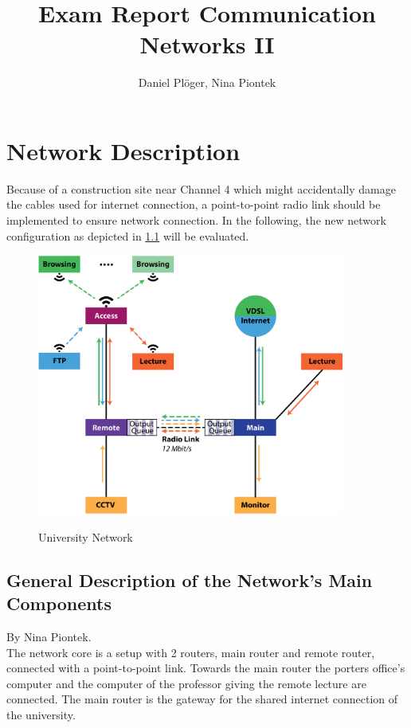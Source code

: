 \documentclass[a4paper,10pt]{book}\usepackage{graphicx}
\title{Exam Report Communication Networks II}
\author{Daniel Plöger, Nina Piontek}
\begin{document}
\maketitle
\tableofcontents



\chapter{Network Description}
Because of a construction site near Channel 4 which might accidentally damage the cables 
used for internet connection,
a point-to-point radio link should be implemented to ensure network connection.
In the following, the new network configuration as depicted in \ref{fig:network} will be evaluated.
\begin{figure}[!ht]
  \centering
    \includegraphics[width=0.9\textwidth]{graphics-03.eps}
    \label{fig:network}
    \caption{University Network}
\end{figure}

\section{General Description of the Network's Main Components}
By Nina Piontek.\\

The network core is a setup with 2 routers, main router and remote router, connected with a point-to-point link. 
Towards the main router the porters office's computer and the computer of the professor giving the remote lecture are connected.
The main router is the gateway for the shared internet connection of the university.
\end{document}
